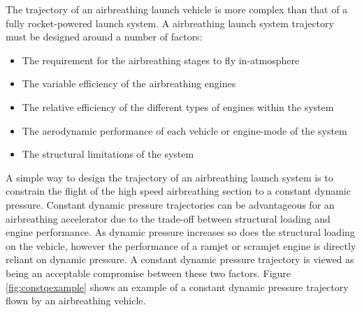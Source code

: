 The trajectory of an airbreathing launch vehicle is more complex than that of a fully rocket-powered launch system. 
A airbreathing launch system trajectory must be designed around a number of factors:
\begin{itemize}
	\item The requirement for the airbreathing stages to fly in-atmosphere 
	\item The variable efficiency of the airbreathing engines
	\item The relative efficiency of the different types of engines within the system
	\item The aerodynamic performance of each vehicle or engine-mode of the system
	\item The structural limitations of the system
\end{itemize}

A simple way to design the trajectory of an airbreathing launch system is to constrain the flight of the high speed airbreathing section to a constant dynamic pressure\cite{Olds1998,Preller2015,Punnoose2007,Kanda1996,Young2006}. 
 Constant dynamic pressure trajectories can be advantageous for an airbreathing accelerator due to the trade-off between structural loading and engine performance\cite{Olds1998}. As dynamic pressure increases so does the structural loading on the vehicle, however the performance of a ramjet or scramjet engine is directly reliant on dynamic pressure\cite{Olds1998}. A constant dynamic pressure trajectory is viewed as being an acceptable compromise between these two factors. Figure \ref{fig:constqexample} shows an example of a constant dynamic pressure trajectory flown by an airbreathing vehicle. 

